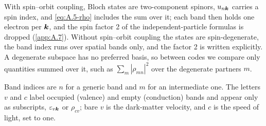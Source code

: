 With spin--orbit coupling, Bloch states are two-component spinors, $u_{n\bm{k}}$ carries a spin index, and \cref{eq:A.5-rho} includes the sum over it; each band then holds one electron per $\bm{k}$, and the spin factor 2 of the independent-particle formulas is dropped (\cref{app:A.7}). Without spin--orbit coupling the states are spin-degenerate, the band index runs over spatial bands only, and the factor 2 is written explicitly. A degenerate subspace has no preferred basis, so between codes we compare only quantities summed over it, such as $\sum_{m}|\rho_{mn}|^2$ over the degenerate partners $m$.

Band indices are $n$ for a generic band and $m$ for an intermediate one. The letters $v$ and $c$ label occupied (valence) and empty (conduction) bands and appear only as subscripts, $\varepsilon_{v\bm{k}}$ or $\rho_{cv}$; bare $v$ is the dark-matter velocity, and $c$ is the speed of light, set to one.
